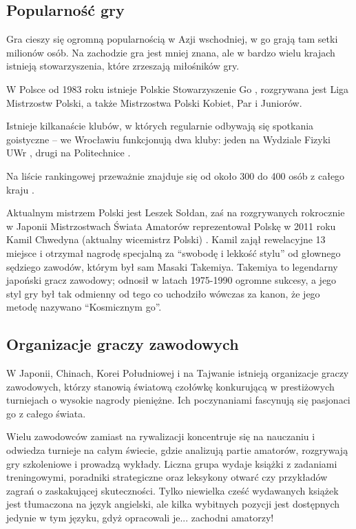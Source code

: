 \documentclass[11pt,leqno]{article}
\begin{document}
\subsection{Popularność gry }

Gra cieszy się ogromną popularnością w Azji wschodniej, w go grają tam setki milionów osób. Na zachodzie gra jest mniej znana, 
ale w bardzo wielu krajach istnieją stowarzyszenia, które zrzeszają miłośników gry. 

W Polsce od 1983 roku istnieje Polskie Stowarzyszenie Go \cite{psg}, 
rozgrywana jest Liga Mistrzostw Polski, a także Mistrzostwa Polski Kobiet, Par i Juniorów. 

Istnieje kilkanaście klubów, w których regularnie odbywają się spotkania goistyczne 
-- we Wrocławiu funkcjonują dwa kluby: jeden na Wydziale Fizyki UWr \cite{gokurabu}, drugi na Politechnice \cite{sente}.

 Na liście rankingowej przeważnie znajduje się od około 300 do 400 osób z całego kraju \cite{ranking}.

Aktualnym mistrzem Polski jest Leszek Sołdan, zaś na rozgrywanych rokrocznie w Japonii Mistrzostwach Świata Amatorów 
reprezentował Polskę w 2011 roku Kamil Chwedyna (aktualny wicemistrz Polski) \cite{kamil1}. 
Kamil zajął rewelacyjne 13 miejsce \cite{kamil2} i otrzymał nagrodę specjalną za 
``swobodę i lekkość stylu'' od głownego sędziego zawodów, którym był sam Masaki Takemiya. 
Takemiya to legendarny japoński gracz zawodowy; odnosił w latach 1975-1990 ogromne sukcesy, a jego styl
gry był tak odmienny od tego co uchodziło wówczas za kanon, że jego metodę nazywano ``Kosmicznym go''.

\subsection{Organizacje graczy zawodowych}
W Japonii, Chinach, Korei Południowej i na Tajwanie istnieją organizacje graczy zawodowych, którzy stanowią światową czołówkę konkurującą w 
prestiżowych turniejach o wysokie nagrody pieniężne. Ich poczynaniami fascynują się pasjonaci go z całego świata. 

Wielu zawodowców zamiast na rywalizacji koncentruje się na nauczaniu i odwiedza turnieje na całym świecie, gdzie analizują 
partie amatorów, rozgrywają gry szkoleniowe i prowadzą wykłady. Liczna grupa wydaje książki z zadaniami treningowymi, 
poradniki strategiczne oraz leksykony otwarć czy przykładów zagrań o zaskakującej skuteczności. 
Tylko niewielka cześć wydawanych książek jest tłumaczona na język angielski, ale kilka wybitnych
 pozycji jest dostępnych jedynie w tym języku, gdyż opracowali je... zachodni amatorzy!
\end{document}
